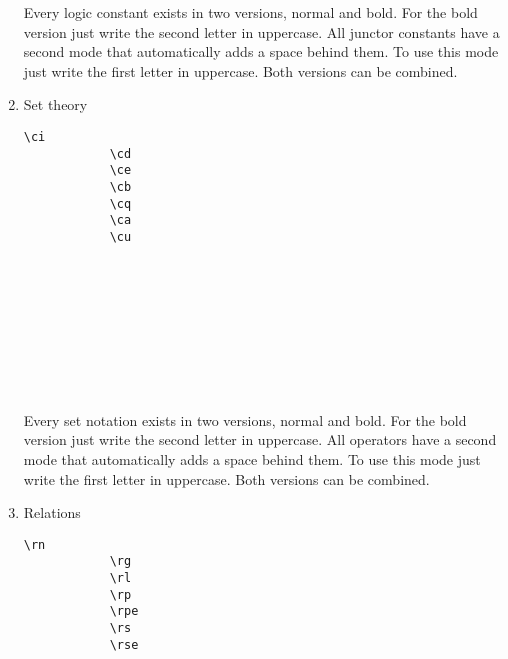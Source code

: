 \documentclass[10pt, a4paper]{article}
\begin{document}
\begin{enumerate}
\begin{center}
		\end{center}
		Every logic constant exists in two versions, normal and bold. For the bold version just write the second letter in uppercase. All junctor constants have a second mode that automatically adds a space behind them. To use this mode just write the first letter in uppercase. Both versions can be combined.
		\item Set theory \begin{center}
			\begin{minipage}[h][4cm][t]{15em}
				\begin{lstlisting}[style=B]
			\ci
			\cd
			\ce
			\cb
			\cq
			\ca
			\cu
				\end{lstlisting}
			\end{minipage}
			\begin{minipage}[h][4cm][t]{15em}
				\begin{fgls}
					\ \\
					\ci\\
					\cd\\
					\ce\\
					\cb\\
					\cq\\
					\ca\\
					\cu
				\end{fgls}
			\end{minipage}
		\end{center}
		Every set notation exists in two versions, normal and bold. For the bold version just write the second letter in uppercase. All operators have a second mode that automatically adds a space behind them. To use this mode just write the first letter in uppercase. Both versions can be combined.
		\item Relations \begin{center}
			\begin{minipage}[h][4cm][t]{15em}
				\begin{lstlisting}[style=B]
			\rn
			\rg
			\rl
			\rp
			\rpe
			\rs
			\rse
				\end{lstlisting}
			\end{minipage}
			\begin{minipage}[h][4cm][t]{15em}
				\begin{fgls}
					\ \\
					\rn\\
					\rg\\
					\rl\\
					\rp\\
					\rpe\\

\end{fgls}
\end{minipage}
\end{center}
\end{enumerate}
\end{document}

